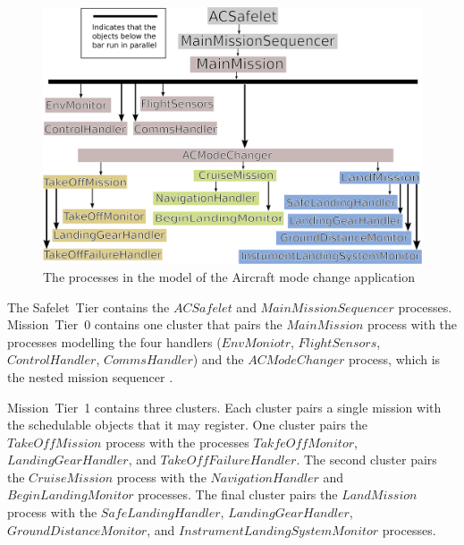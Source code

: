 \documentclass[10pt,a4paper]{article}
\begin{document}
\begin{figure}[!h]
\begin{center}
\includegraphics[scale=0.4]{AircraftStructure.png}
\caption{The processes in the model of the Aircraft mode change application \label{AircraftDiagram}}
\end{center}
\end{figure}

The Safelet~Tier contains the $ACSafelet$ and $MainMissionSequencer$ processes. Mission~Tier~0 contains one cluster that pairs the $MainMission$ process with the processes modelling the four handlers ($EnvMoniotr$, $FlightSensors$, $ControlHandler$, $CommsHandler$) and the $ACModeChanger$ process, which is the nested mission sequencer . 

Mission~Tier~1 contains three clusters. Each cluster pairs a single mission with the schedulable objects that it may register. One cluster pairs the $TakeOffMission$ process with the processes $TakfeOffMonitor$, $LandingGearHandler$, and $TakeOffFailureHandler$. The second cluster pairs the $CruiseMission$ process with the $NavigationHandler$ and $BeginLandingMonitor$ processes. The final cluster pairs the $LandMission$ process with the $SafeLandingHandler$, $LandingGearHandler$, $GroundDistanceMonitor$, and $InstrumentLandingSystemMonitor$ processes. 
\end{document}
